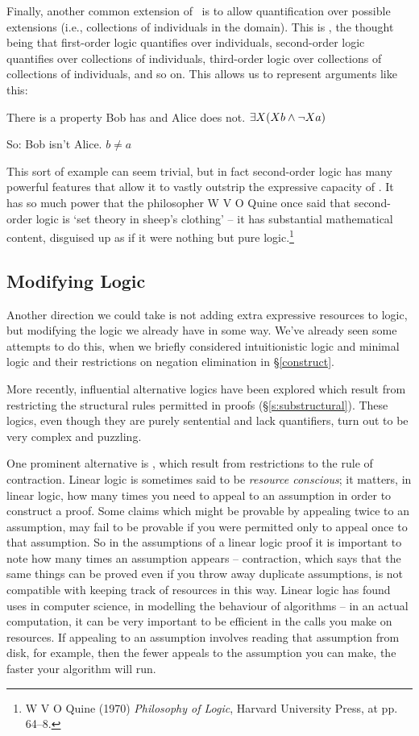 Finally, another common extension of \FOL\ is to allow quantification over possible extensions (i.e., collections of individuals in the domain). This is , the thought being that first-order logic quantifies over individuals, second-order logic quantifies over collections of individuals, third-order logic over collections of collections of individuals, and so on. This allows us to represent arguments like this: \begin{earg}
	\item There is a property Bob has and Alice does not. $\exists X (Xb \wedge \neg Xa)$
	\item[So:] Bob isn't Alice. $b≠a$
\end{earg}
This sort of example can seem trivial, but in fact second-order logic has many powerful features that allow it to vastly outstrip the expressive capacity of \FOL. It has so much power that the philosopher W V O Quine once said that second-order logic is `set theory in sheep's clothing' – it has substantial mathematical content, disguised up as if it were nothing but pure logic.\footnote{W V O Quine (1970) \emph{Philosophy of Logic}, Harvard University Press, at pp. 64–8.}

\subsection{Modifying Logic}\label{s:modifying}

Another direction we could take is not adding extra expressive resources to logic, but modifying the logic we already have in some way. We've already seen some attempts to do this, when we briefly considered intuitionistic logic and minimal logic and their restrictions on negation elimination in §\ref{construct}. 

More recently, influential alternative logics have been explored which result from restricting the structural rules permitted in proofs (§\ref{s:substructural}). These logics, even though they are purely sentential and lack quantifiers, turn out to be very complex and puzzling.

One prominent alternative is , which result from restrictions to the rule of contraction. Linear logic is sometimes said to be \emph{resource conscious}; it matters, in linear logic, how many times you need to appeal to an assumption in order to construct a proof. Some claims which might be provable by appealing twice to an assumption, may fail to be provable if you were permitted only to appeal once to that assumption. So in the assumptions of a linear logic proof it is important to note how many times an assumption appears – contraction, which says that the same things can be proved even if you throw away duplicate assumptions, is not compatible with keeping track of resources in this way. Linear logic has found uses in computer science, in modelling the behaviour of algorithms – in an actual computation, it can be very important to be efficient in the calls you make on resources. If appealing to an assumption involves reading that assumption from disk, for example, then the fewer appeals to the assumption you can make, the faster your algorithm will run.

